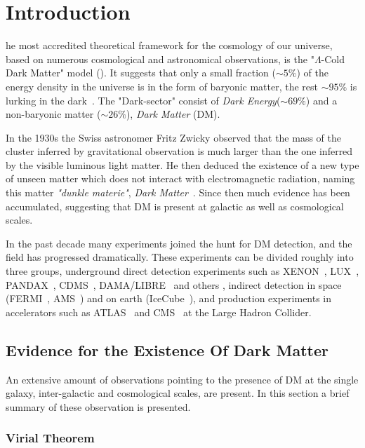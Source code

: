 %
%
\let\textcircled=\pgftextcircled
\chapter{Introduction}
\label{chap:intro}

he most accredited theoretical framework for the cosmology of our universe, based on numerous cosmological and astronomical observations, is the "$\Lambda$-Cold Dark Matter" model (\cdm). It suggests that only a small fraction ($\sim 5\%$) of the energy density in the universe is in the form of baryonic matter, the rest  $\sim 95\%$ is lurking in the dark~\cite{WMAP:9years, Planck}. The "Dark-sector" consist of \textit{Dark Energy}($\sim 69\%$) and a non-baryonic matter ($\sim 26\%$), \textit{Dark Matter} (DM).

In the 1930s the Swiss astronomer Fritz Zwicky observed that the mass of the cluster inferred by gravitational observation is much larger than the one inferred by the visible luminous light matter. He then deduced the existence of a new type of unseen matter which does not interact with electromagnetic radiation, naming this matter \textit{"dunkle materie"}, \textit{Dark Matter}~\cite{Zwicky:1937zza}. Since then much evidence has been accumulated, suggesting that DM is present at galactic as well as cosmological scales.

In the past decade many experiments joined the hunt for DM detection, and the field has progressed dramatically. These experiments can be divided
roughly into three groups, underground direct detection experiments such as XENON~\cite{xe100_run_combination,Xenon1TResults}, LUX~\cite{LUXnew}, PANDAX~\cite{PANDAX}, CDMS~\cite{CDMSlite}, DAMA/LIBRE~\cite{DAMA} and others , indirect detection in space (FERMI~\cite{FermiLAT:2011ab}, AMS~\cite{AMS}) and on earth (IceCube~\cite{IceCube}), and production experiments in accelerators such as ATLAS~\cite{AtlasDM} and CMS~\cite{CmsDM} at the Large Hadron Collider.
\section{Evidence for the Existence Of Dark Matter}
An extensive amount of observations pointing to the presence of DM at the  single galaxy, inter-galactic and cosmological scales, are present. In this section a brief summary of these observation is presented. 

\subsection{Virial Theorem}

